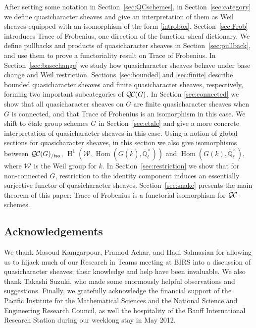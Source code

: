 \documentclass{amsart}
\theoremstyle{plain}
\theoremstyle{definition}
\theoremstyle{remark}
\newcommand{\EE}{\mathbb{\bar Q}_\ell}
\newcommand{\bFq}{\bar{k}}
\newcommand{\Fq}{k}
\newcommand{\EEx}{\EE^\times}
\newcommand{\Weil}[1]{\mathcal{W}_{#1}}
\DeclareMathOperator{\Hom}{Hom}
\DeclareMathOperator{\Hh}{H}
\newcommand{\QC}{{\mathcal{Q\hskip-0.8pt C}}}
\newcommand{\QCiso}[1]{\QC(#1)_{/\text{iso}}}
\begin{document}
After setting some notation in Section~\ref{sec:QCschemes}, in Section~\ref{sec:category} we define quasicharacter sheaves and give an interpretation of
them as Weil sheaves equipped with an isomorphism of the form  \eqref{introbox}.
Section~\ref{sec:Frob} introduces Trace of Frobenius,
one direction of the function--sheaf dictionary.
We define pullbacks and products of quasicharacter sheaves in Section~\ref{sec:pullback}, and use
them to prove a functoriality result on Trace of Frobenius.
In Section~\ref{sec:basechange} we study how quasicharacter sheaves behave under base change
and Weil restriction.
Sections~\ref{sec:bounded} and \ref{sec:finite} describe bounded quasicharacter sheaves and finite quasicharacter sheaves, respectively,
forming two important subcategories of $\QC(G)$.
In Section \ref{sec:connected} we show that all quasicharacter sheaves on $G$ are finite quasicharacter sheaves when $G$ is connected, and that Trace of Frobenius is an isomorphism in this case.
We shift to \'etale group schemes $G$ in Section~\ref{sec:etale} and give a more concrete interpretation
of quasicharacter sheaves in this case.  Using a notion of global sections for quasicharacter sheaves, in this section
we also give isomorphisms between $\QCiso{G}$, $\Hh^1(\Weil{}, \Hom(G(\bFq), \EEx))$ and $\Hom(G(\Fq), \EEx)$, where $\Weil{}$ is the Weil group for $\Fq$.
In Section~\ref{sec:restriction} we show that for non-connected $G$, restriction to the identity component
induces an essentially surjective functor of quasicharacter sheaves.
Section~\ref{sec:snake} presents the main theorem of this paper: Trace of Frobenius
is a functorial isomorphism for $\QC$-schemes.

\subsection*{Acknowledgements}
We thank Masoud Kamgarpour, Pramod Achar, and Hadi Salmasian
for allowing us to hijack much of our Research in Teams meeting at BIRS into a discussion of
quasicharacter sheaves; their knowledge and help have been invaluable.
We also thank Takashi Suzuki, who made some enormously helpful observations and suggestions.
%
Finally, we gratefully acknowledge the financial support of the Pacific Institute for the Mathematical Sciences
and the National Science and Engineering Research Council,
as well the hospitality of the Banff International Research Station during our weeklong stay in May 2012.
\end{document}
